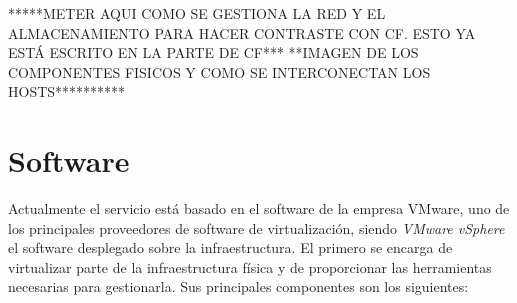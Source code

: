 *****METER AQUI COMO SE GESTIONA LA RED Y EL ALMACENAMIENTO PARA HACER CONTRASTE CON CF. ESTO YA ESTÁ ESCRITO EN LA PARTE DE CF***
**IMAGEN DE LOS COMPONENTES FISICOS Y COMO SE INTERCONECTAN LOS HOSTS**********

\section{Software}
\label{subsec:softwareinstalado}
Actualmente el servicio está basado en el software de la empresa VMware, uno de los principales proveedores de software de virtualización, siendo \emph{VMware vSphere} el software desplegado sobre la infraestructura. El primero se encarga de virtualizar parte de la infraestructura física y de proporcionar las herramientas necesarias para gestionarla. Sus principales componentes son los siguientes:
